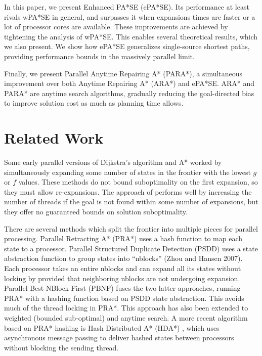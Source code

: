 \documentclass[letterpaper]{article}
\begin{document}
In this paper, we present Enhanced PA*SE (ePA*SE). Its performance at least rivals wPA*SE in general, and surpasses it when expansions times are faster or a lot of processor cores are available. These improvements are achieved by tightening the analysis of wPA*SE. This enables several theoretical results, which we also present. We show how ePA*SE generalizes single-source shortest paths, providing performance bounds in the massively parallel limit.

Finally, we present  Parallel Anytime Repairing A* (PARA*), a simultaneous improvement over both Anytime Repairing A* (ARA*) and ePA*SE. ARA* and PARA* are anytime search algorithms, gradually reducing the goal-directed bias to improve solution cost as much as planning time allows.

\section{Related Work}

Some early parallel versions of Dijkstra’s algorithm \cite{quinn86} and A* \cite{irani86} \cite{leifker85} worked by simultaneously expanding some number of states in the frontier with the lowest $g$ or $f$ values. These methods do not bound suboptimality on the first expansion, so they must allow re-expansions.
The approach of \cite{vidal10} performs well by increasing the number of threads if the goal is not found within some number of expansions, but they offer no guaranteed bounds on solution suboptimality.

There are several methods which split the frontier into multiple pieces for parallel processing.
Parallel Retracting A* (PRA*) \cite{evett95} uses a hash function to map each state to a processor.
Parallel Structured Duplicate Detection (PSDD) \cite{zhou07}
uses a state abstraction function to group states into
``nblocks” (Zhou and Hansen 2007).
Each processor takes an entire nblocks and can expand all its states without locking by provided
that neighboring nblocks are not undergoing expansion.
Parallel Best-NBlock-First (PBNF) \cite{burns_10} fuses the two latter
approaches, running PRA* with a hashing function
based on PSDD state abstraction.
This avoids much of the thread locking in PRA*.
This approach has also been extended to weighted (bounded
sub-optimal) and anytime search.
A more recent algorithm based on PRA* hashing is Hash Distributed A* (HDA*) \cite{kishimoto09},
which uses asynchronous message passing to deliver hashed states between processors without blocking the sending thread.
\end{document}
